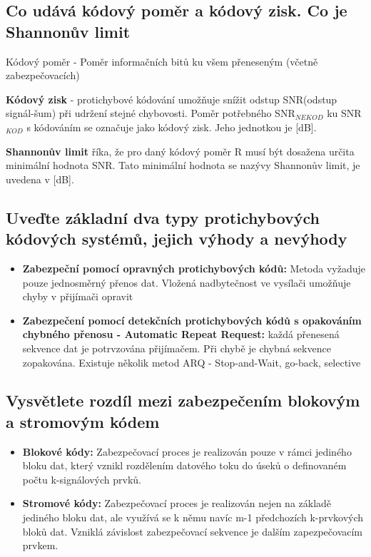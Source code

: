 \subsection{Co udává kódový poměr a kódový zisk. Co je Shannonův limit}
Kódový poměr - Poměr informačních bitů ku všem přeneseným (včetně zabezpečovacích)

\textbf{Kódový zisk} - protichybové kódování umožňuje snížit odstup SNR(odstup signál-šum) při udržení stejné chybovosti.
Poměr potřebného SNR$_{NEKOD}$ ku SNR$_{KOD}$ s kódováním se označuje jako kódový zisk. 
Jeho jednotkou je [dB].

\textbf{Shannonův limit} říka, že pro daný kódový poměr R musí být dosažena určita minimální hodnota SNR.
Tato minimální hodnota se nazývy Shannonův limit, je uvedena v [dB].

\subsection{Uveďte základní dva typy protichybových kódových systémů, jejich výhody a nevýhody}
\begin{itemize}
    \item \textbf{Zabezpeční pomocí opravných protichybových kódů:} Metoda vyžaduje pouze jednosměrný přenos dat.
    Vložená nadbytečnost ve vysílači umožňuje chyby v přijímači opravit
    \item \textbf{Zabezpečení pomocí detekčních protichybových kódů s opakováním chybného přenosu - Automatic Repeat Request: }každá přenesená sekvence dat je potrvzována přijímačem.
    Při chybě je chybná sekvence zopakována.
    Existuje několik metod ARQ - Stop-and-Wait, go-back, selective
\end{itemize}
\subsection{Vysvětlete rozdíl mezi zabezpečením blokovým a stromovým kódem}
\begin{itemize}
    \item \textbf{Blokové kódy:} Zabezpečovací proces je realizován pouze v rámci jediného bloku dat, který vznikl rozdělením datového toku do úseků o definovaném počtu k-signálových prvků.
    \item \textbf{Stromové kódy: }Zabezpečovací proces je realizován nejen na základě jediného bloku dat, ale využívá se k němu navíc m-1 předchozích k-prvkových bloků dat.
    Vzniklá závislost zabezpečovací sekvence je dalším zapezpečovacím prvkem.
\end{itemize}


